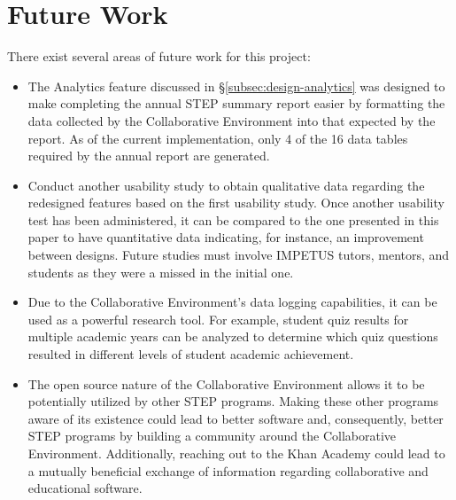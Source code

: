 \section{Future Work}
There exist several areas of future work for this project:
\begin{itemize}
	\item The Analytics feature discussed in \S \ref{subsec:design-analytics} was designed to make completing the annual STEP summary report easier by formatting the data collected by the Collaborative Environment into that expected by the report. As of the current implementation, only 4 of the 16 data tables required by the annual report are generated.
	\item Conduct another usability study to obtain qualitative data regarding the redesigned features based on the first usability study. Once another usability test has been administered, it can be compared to the one presented in this paper to have quantitative data indicating, for instance, an improvement between designs. Future studies must involve IMPETUS tutors, mentors, and students as they were a missed in the initial one.
	\item Due to the Collaborative Environment's data logging capabilities, it can be used as a powerful research tool. For example, student quiz results for multiple academic years can be analyzed to determine which quiz questions resulted in different levels of student academic achievement.
	\item The open source nature of the Collaborative Environment allows it to be potentially utilized by other STEP programs. Making these other programs aware of its existence could lead to better software and, consequently, better STEP programs by building a community around the Collaborative Environment. Additionally, reaching out to the Khan Academy could lead to a mutually beneficial exchange of information regarding collaborative and educational software.
\end{itemize}